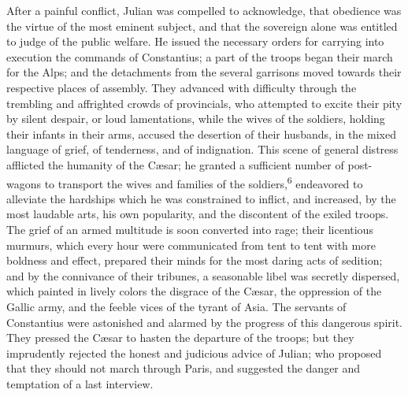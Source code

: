 After a painful conflict, Julian was compelled to acknowledge,
that obedience was the virtue of the most eminent subject, and
that the sovereign alone was entitled to judge of the public
welfare. He issued the necessary orders for carrying into
execution the commands of Constantius; a part of the troops began
their march for the Alps; and the detachments from the several
garrisons moved towards their respective places of assembly. They
advanced with difficulty through the trembling and affrighted
crowds of provincials, who attempted to excite their pity by
silent despair, or loud lamentations, while the wives of the
soldiers, holding their infants in their arms, accused the
desertion of their husbands, in the mixed language of grief, of
tenderness, and of indignation. This scene of general distress
afflicted the humanity of the Cæsar; he granted a sufficient
number of post-wagons to transport the wives and families of the
soldiers,\textsuperscript{6} endeavored to alleviate the hardships which he was
constrained to inflict, and increased, by the most laudable arts,
his own popularity, and the discontent of the exiled troops. The
grief of an armed multitude is soon converted into rage; their
licentious murmurs, which every hour were communicated from tent
to tent with more boldness and effect, prepared their minds for
the most daring acts of sedition; and by the connivance of their
tribunes, a seasonable libel was secretly dispersed, which
painted in lively colors the disgrace of the Cæsar, the
oppression of the Gallic army, and the feeble vices of the tyrant
of Asia. The servants of Constantius were astonished and alarmed
by the progress of this dangerous spirit. They pressed the Cæsar
to hasten the departure of the troops; but they imprudently
rejected the honest and judicious advice of Julian; who proposed
that they should not march through Paris, and suggested the
danger and temptation of a last interview.


